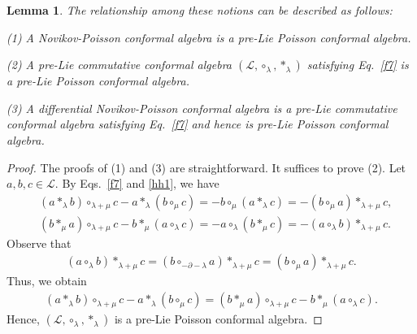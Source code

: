 \documentclass[11pt,letterpaper,reqno]{amsart}
\newtheorem{lemma}[theorem]{Lemma}
\theoremstyle{definition}
\numberwithin{equation}{section}
\begin{document}
\begin{lemma}\label{Lem1.2}
The relationship among these notions can be described as follows:

(1) A Novikov-Poisson conformal algebra is a pre-Lie Poisson conformal algebra.

(2) A pre-Lie commutative conformal algebra $(\mathcal{L} ,\circ_\lambda,\ast_\lambda)$ satisfying Eq.~\eqref{f7} is a pre-Lie Poisson conformal algebra.

(3) A differential Novikov-Poisson conformal algebra is a pre-Lie commutative conformal algebra satisfying Eq.~\eqref{f7} and hence is pre-Lie Poisson conformal algebra.
\end{lemma}

\begin{proof}
    The proofs of (1) and (3) are straightforward. It suffices to prove (2). Let $a,b,c \in \mathcal{L}$. By Eqs.~\eqref{f7} and \eqref{hh1}, we have
   \begin{align*}
        &(a\ast_\lambda b)\circ_{\lambda+\mu}c-a\ast_\lambda(b\circ_\mu c)=-b\circ_\mu (a\ast_\lambda c)=-(b\circ_{\mu} a)\ast_{\lambda+\mu}c,\\
        &(b\ast_\mu a)\circ_{\lambda+\mu}c-b\ast_\mu(a\circ_\lambda c)=-a\circ_\lambda (b\ast_\mu c)=-(a\circ_\lambda b)\ast_{\lambda+\mu}c.
   \end{align*}
Observe that
   \begin{align*}
        (a\circ_\lambda b)\ast_{\lambda+\mu}c=(b\circ_{-\partial-\lambda} a)\ast_{\lambda+\mu}c=(b\circ_{\mu} a)\ast_{\lambda+\mu}c.
   \end{align*}
Thus, we obtain
   \begin{align*}
       (a\ast_\lambda b)\circ_{\lambda+\mu}c-a\ast_\lambda(b\circ_\mu c)=(b\ast_\mu a)\circ_{\lambda+\mu}c-b\ast_\mu(a\circ_\lambda c).
   \end{align*}
Hence, $(\mathcal{L} ,\circ_\lambda,\ast_\lambda)$ is a pre-Lie Poisson conformal algebra.
\end{proof}
\end{document}
